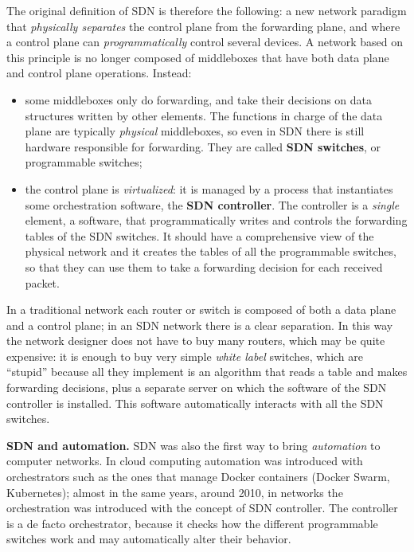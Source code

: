 The original definition of SDN is therefore the following: a new network paradigm that \emph{physically separates} the control plane from the forwarding plane, and where a control plane can \emph{programmatically} control several devices. A network based on this principle is no longer composed of middleboxes that have both data plane and control plane operations. Instead:

\begin{itemize}
\item some middleboxes only do forwarding, and take their decisions on data structures written by other elements. The functions in charge of the data plane are typically \emph{physical} middleboxes, so even in SDN there is still hardware responsible for forwarding. They are called \textbf{SDN switches}, or programmable switches;
\item the control plane is \emph{virtualized}: it is managed by a process that instantiates some orchestration software, the \textbf{SDN controller}. The controller is a \emph{single} element, a software, that programmatically writes and controls the forwarding tables of the SDN switches. It should have a comprehensive view of the physical network and it creates the tables of all the programmable switches, so that they can use them to take a forwarding decision for each received packet.
\end{itemize}

In a traditional network each router or switch is composed of both a data plane and a control plane; in an SDN network there is a clear separation. In this way the network designer does not have to buy many routers, which may be quite expensive: it is enough to buy very simple \emph{white label} switches, which are ``stupid'' because all they implement is an algorithm that reads a table and makes forwarding decisions, plus a separate server on which the software of the SDN controller is installed. This software automatically interacts with all the SDN switches.

\begin{notebox}
	\textbf{SDN and automation.} SDN was also the first way to bring \emph{automation} to computer networks. In cloud computing automation was introduced with orchestrators such as the ones that manage Docker containers (Docker Swarm, Kubernetes); almost in the same years, around 2010, in networks the orchestration was introduced with the concept of SDN controller. The controller is a de facto orchestrator, because it checks how the different programmable switches work and may automatically alter their behavior.
\end{notebox}

